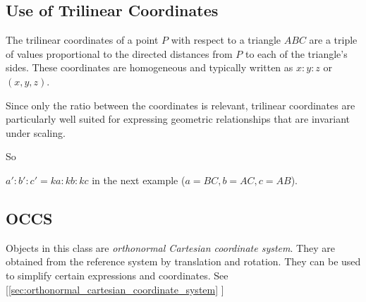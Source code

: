 \subsection{Use of Trilinear Coordinates}
\label{sub:use_of_trilinear_coordinates}

The trilinear coordinates of a point $P$ with respect to a triangle $ABC$ are a triple of values proportional to the directed distances from $P$ to each of the triangle’s sides. These coordinates are homogeneous and typically written as $x : y : z$ or $(x, y, z)$.

Since only the ratio between the coordinates is relevant, trilinear coordinates are particularly well suited for expressing geometric relationships that are invariant under scaling.

So

$ a' : b' : c' = ka : kb : kc$ in the next example ($a = BC, b = AC, c = AB$).

\begin{minipage}{.5\textwidth}
\end{minipage}
\begin{minipage}{.5\textwidth}
\begin{tkzexample}
\end{tkzexample}
\end{minipage}

\subsection{OCCS}

Objects in this class are \emph{orthonormal Cartesian coordinate system}. They are obtained from the reference system by translation and rotation. They can be used to simplify certain expressions and coordinates.
See  [\ref{sec:orthonormal_cartesian_coordinate_system}
]
\endinput